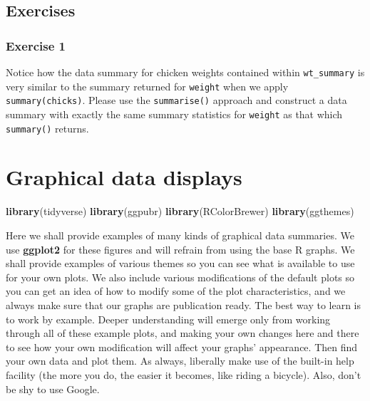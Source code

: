 \documentclass[english,10pt,a4paper,oneside]{book}
\newenvironment{Shaded}{\begin{snugshade}}{\end{snugshade}}
\newcommand{\KeywordTok}[1]{\textcolor[rgb]{0.13,0.29,0.53}{\textbf{#1}}}
\newcommand{\NormalTok}[1]{#1}
\theoremstyle{definition}
\theoremstyle{definition}
\theoremstyle{definition}
\theoremstyle{remark}
\begin{document}
\hypertarget{exercises}{%
\section{Exercises}\label{exercises}}

\hypertarget{exercise-1}{%
\subsection{Exercise 1}\label{exercise-1}}

Notice how the data summary for chicken weights contained within
\texttt{wt\_summary} is very similar to the summary returned for
\texttt{weight} when we apply \texttt{summary(chicks)}. Please use the
\texttt{summarise()} approach and construct a data summary with exactly
the same summary statistics for \texttt{weight} as that which
\texttt{summary()} returns.

\hypertarget{graphical-data-displays}{%
\chapter{Graphical data displays}\label{graphical-data-displays}}

\begin{Shaded}
\begin{Highlighting}[]
\KeywordTok{library}\NormalTok{(tidyverse)}
\KeywordTok{library}\NormalTok{(ggpubr)}
\KeywordTok{library}\NormalTok{(RColorBrewer)}
\KeywordTok{library}\NormalTok{(ggthemes)}
\end{Highlighting}
\end{Shaded}

Here we shall provide examples of many kinds of graphical data
summaries. We use \textbf{ggplot2} for these figures and will refrain
from using the base R graphs. We shall provide examples of various
themes so you can see what is available to use for your own plots. We
also include various modifications of the default plots so you can get
an idea of how to modify some of the plot characteristics, and we always
make sure that our graphs are publication ready. The best way to learn
is to work by example. Deeper understanding will emerge only from
working through all of these example plots, and making your own changes
here and there to see how your own modification will affect your graphs'
appearance. Then find your own data and plot them. As always, liberally
make use of the built-in help facility (the more you do, the easier it
becomes, like riding a bicycle). Also, don't be shy to use Google.
\end{document}

